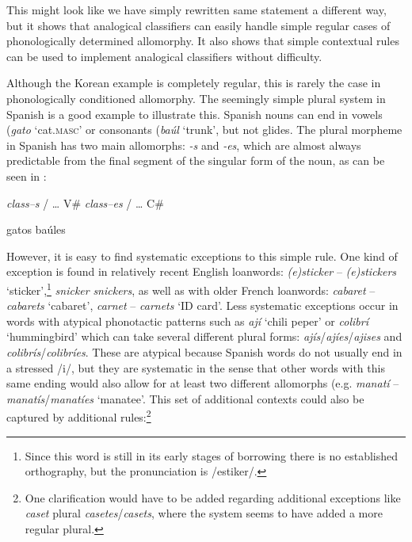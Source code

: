 This might look like we have simply rewritten same statement a different way, but it shows that analogical classifiers can easily handle simple regular cases of phonologically determined allomorphy.
It also shows that simple contextual rules can be used to implement analogical classifiers without difficulty.

Although the Korean example is completely regular, this is rarely the case in phonologically conditioned allomorphy. The seemingly simple plural system in Spanish is a good example to illustrate this. Spanish nouns can end in vowels (\textit{gato} `cat.\textsc{masc}' or consonants (\textit{baúl} `trunk', but not glides. The plural morpheme in Spanish has two main allomorphs: \textit{-s} and \textit{-es}, which are almost always predictable from the final segment of the singular form of the noun, as can be seen in :

\begin{exe}
    \ex \label{exe-sp-plurals}
    \begin{xlist}
        \ex \textit{class--s} / \dots{} V\#
        \ex \textit{class--es} / \dots{} C\#
    \end{xlist}
    \ex
    \begin{xlist}
        \ex gatos
        \ex baúles
    \end{xlist}
\end{exe}

However, it is easy to find systematic exceptions to this simple rule. One kind of  exception is found in relatively recent English loanwords: \textit{(e)sticker} -- \textit{(e)stickers} `sticker',\footnote{Since this word is still in its early stages of borrowing there is no established orthography, but the pronunciation is /estiker/.} \textit{snicker} \textit{snickers}, as well as with older French loanwords: \textit{cabaret} -- \textit{cabarets} `cabaret', \textit{carnet} -- \textit{carnets} `ID card'. Less systematic exceptions occur in words with atypical phonotactic patterns such as \textit{ají} `chili peper' or \textit{colibrí} `hummingbird' which can take several different plural forms: \textit{ajís}/\textit{ajíes}/\textit{ajises} and \textit{colibrís}/\textit{colibríes}. These are atypical because Spanish words do not usually end in a stressed /i/, but they are systematic in the sense that other words with this same ending would also allow for at least two different allomorphs (e.g. \textit{manatí} -- \textit{manatís}/\textit{manatíes} `manatee'. This set of additional contexts could also be captured by additional rules:\footnote{One clarification would have to be added regarding additional exceptions like \textit{caset} plural \textit{casetes}/\textit{casets}, where the system seems to have added a more regular plural.}

